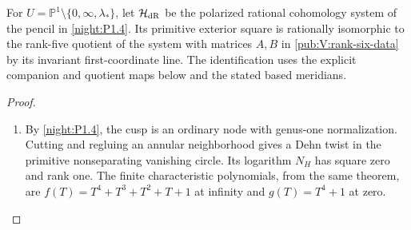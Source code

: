 \begin{theorem}\hypertarget{tag-02O7}{}\label{maps:src:F.3.5}


For $U=\mathbb P^1\setminus\{0,\infty,\lambda_*\}$, let
$\mathcal H_{\rm dR}$ be the polarized rational cohomology system
of the pencil in \cref{night:P1.4}. Its primitive exterior square
is rationally isomorphic to the rank-five quotient of the system
with matrices $A,B$ in \cref{pub:V:rank-six-data} by its invariant
first-coordinate line. The identification uses the explicit
companion and quotient maps below and the stated based meridians.
\end{theorem}


\begin{proof}
\begin{enumerate}[label={$\langle1\rangle$\arabic*.}]
\item By \cref{night:P1.4}, the cusp is an ordinary node with
genus-one normalization. Cutting and regluing an annular neighborhood
gives a Dehn twist in the primitive nonseparating vanishing circle.
Its logarithm $N_H$ has square zero and rank one.
The finite characteristic polynomials, from the same theorem, are
$f(T)=T^4+T^3+T^2+T+1$ at infinity and $g(T)=T^4+1$ at zero.


\end{enumerate}
\end{proof}
